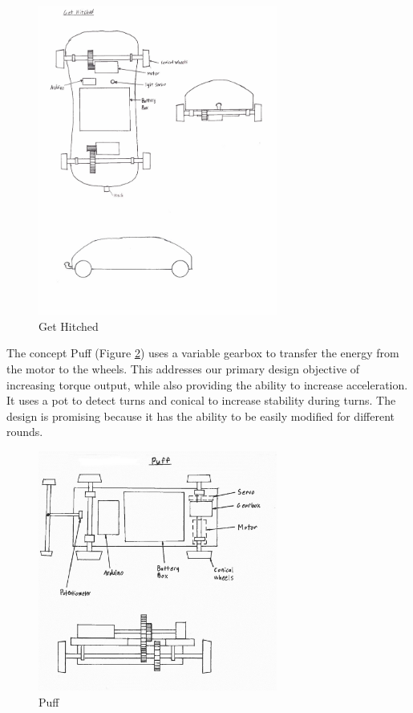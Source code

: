 \documentclass[class=../report, crop=false]{standalone}
\begin{document}
\begin{figure}[H]
	\centering
	\includegraphics[width=0.7\textwidth]{../res/img/gethitched}
	\caption{Get Hitched}
	\label{fig:gethitched}
\end{figure}

\clearpage

The concept Puff (Figure \ref{fig:puff}) uses a variable \gls{gearbox} to transfer the energy from the motor to the wheels.
This addresses our primary design objective of increasing \gls{torque} output, while also providing the ability to increase acceleration.
It uses a \gls{pot} to detect turns and \gls{conical} to increase stability during turns.
The design is promising because it has the ability to be easily modified for different rounds.

\begin{figure}[H]
	\centering
	\includegraphics[width=0.7\textwidth]{../res/img/puff}
	\caption{Puff}
	\label{fig:puff}
\end{figure}
\end{document}
